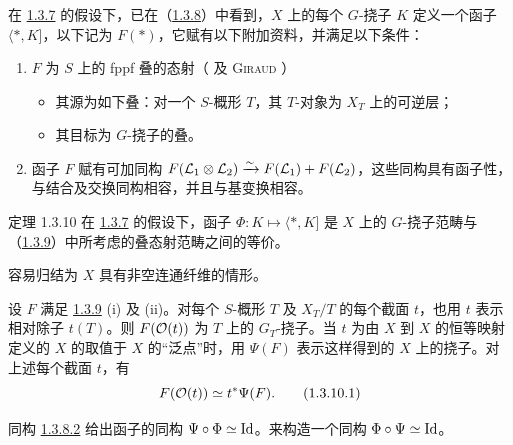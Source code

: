 \subsubsection{} 在 \hyperref[XVIII.subsubsec1.3.7]{1.3.7} 的假设下，已在（\hyperref[XVIII.for1.3.8]{1.3.8}）中看到，$X$ 上的每个 $G$-挠子 $K$ 定义一个函子 $\langle \ast,K]$，以下记为 $F(\ast)$，它赋有\pageoriginale 以下附加资料，并满足以下条件： \begin{enumerate} \renewcommand{\theenumi}{\roman{enumi}} \renewcommand{\labelenumi}{(\theenumi)} \item $F$ 为 $S$ 上的 fppf 叠的态射（ 及 \textsc{Giraud} \cite{sga4.exp.XVIII.bib.1}） \begin{itemize} \item[--] 其源为如下叠：对一个 $S$-概形 $T$，其 $T$-对象为 $X_{T}$ 上的可逆层；

\item[--] 其目标为 $G$-挠子的叠。 \end{itemize}

\item 函子 $F$ 赋有可加同构 $F({\mathcal L}_{1}\otimes {\mathcal L}_{2})\xrightarrow{\sim}F({\mathcal L}_{1})+F({\mathcal L}_{2})$，这些同构具有函子性，与结合及交换同构相容，并且与基变换相容。 \end{enumerate}

\begin{enonce*}{定理 1.3.10} 在 \hyperref[XVIII.subsubsec1.3.7]{1.3.7} 的假设下，函子 $\Phi:K\mapsto \langle \ast,K]$ 是 $X$ 上的 $G$-挠子范畴与（\hyperref[XVIII.subsubsec1.3.9]{1.3.9}）中所考虑的叠态射范畴之间的等价。 \end{enonce*}

容易归结为 $X$ 具有非空连通纤维的情形。

设 $F$ 满足 \hyperref[XVIII.subsubsec1.3.9]{1.3.9} (i) 及 (ii)。对每个 $S$-概形 $T$ 及 $X_{T}/T$ 的每个截面 $t$，也用 $t$ 表示相对除子 $t(T)$。则 $F({\mathcal O}(t))$ 为 $T$ 上的 $G_{T}$-挠子。当 $t$ 为由 $X$ 到 $X$ 的恒等映射定义的 $X$ 的取值于 $X$ 的“泛点”时，用 $\Psi(F)$ 表示这样得到的 $X$ 上的挠子。对上述每个截面 $t$，有 \begin{equation*}
F({\mathcal O}(t))\simeq t^{\ast}\Psi(F){}.\tag{1.3.10.1}
\end{equation*}

同构 \hyperref[XVIII.par1.3.8.2]{1.3.8.2} 给出函子的同构 $\Psi\circ\Phi \simeq \operatorname{Id}$。来构造一个同构 $\Phi\circ\Psi\simeq \operatorname{Id}$。

